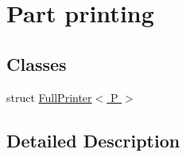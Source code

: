 \hypertarget{group__Printers}{}\section{Part printing}
\label{group__Printers}
\subsection*{Classes}
\begin{DoxyCompactItemize}
\item 
struct \hyperlink{structFullPrinter}{Full\+Printer$<$ P $>$}
\end{DoxyCompactItemize}


\subsection{Detailed Description}
